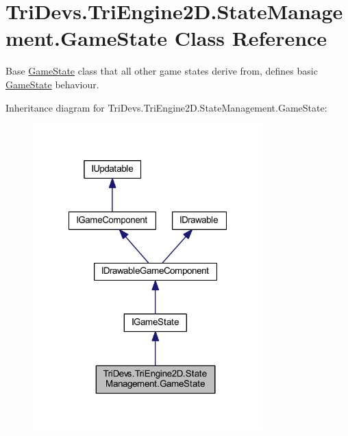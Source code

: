 \hypertarget{class_tri_devs_1_1_tri_engine2_d_1_1_state_management_1_1_game_state}{\section{Tri\-Devs.\-Tri\-Engine2\-D.\-State\-Management.\-Game\-State Class Reference}
\label{class_tri_devs_1_1_tri_engine2_d_1_1_state_management_1_1_game_state}
}


Base \hyperlink{class_tri_devs_1_1_tri_engine2_d_1_1_state_management_1_1_game_state}{Game\-State} class that all other game states derive from, defines basic \hyperlink{class_tri_devs_1_1_tri_engine2_d_1_1_state_management_1_1_game_state}{Game\-State} behaviour.  




Inheritance diagram for Tri\-Devs.\-Tri\-Engine2\-D.\-State\-Management.\-Game\-State\-:
\nopagebreak
\begin{figure}[H]
\begin{center}
\leavevmode
\includegraphics[width=251pt]{class_tri_devs_1_1_tri_engine2_d_1_1_state_management_1_1_game_state__inherit__graph}
\end{center}
\end{figure}


